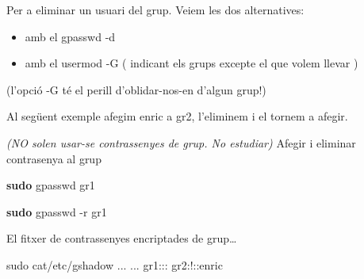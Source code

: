 \documentclass[
  a4paper,
]{article}
\newenvironment{Shaded}{\begin{snugshade}}{\end{snugshade}}
\newcommand{\AttributeTok}[1]{\textcolor[rgb]{0.13,0.29,0.53}{#1}}
\newcommand{\ExtensionTok}[1]{#1}
\newcommand{\FunctionTok}[1]{\textcolor[rgb]{0.13,0.29,0.53}{\textbf{#1}}}
\newcommand{\NormalTok}[1]{#1}
\newcommand{\StringTok}[1]{\textcolor[rgb]{0.31,0.60,0.02}{#1}}
\begin{document}
Per a eliminar un usuari del grup. Veiem les dos alternatives:

\begin{itemize}
\item
  amb el gpasswd -d
\item
  amb el usermod -G ( indicant els grups excepte el que volem llevar )
\end{itemize}

(l'opció -G té el perill d'oblidar-nos-en d'algun grup!)

Al següent exemple afegim enric a gr2, l'eliminem i el tornem a afegir.

\begin{Shaded}
\end{Shaded}

\emph{(NO solen usar-se contrassenyes de grup. No estudiar)} Afegir i
eliminar contrasenya al grup

\begin{Shaded}
\begin{Highlighting}[]
\FunctionTok{sudo}\NormalTok{ gpasswd gr1}
\end{Highlighting}
\end{Shaded}

\begin{Shaded}
\begin{Highlighting}[]
\FunctionTok{sudo}\NormalTok{ gpasswd }\AttributeTok{{-}r}\NormalTok{ gr1}
\end{Highlighting}
\end{Shaded}

El fitxer de contrassenyes encriptades de grup\ldots{}

\begin{Shaded}
\begin{Highlighting}[]
\NormalTok{sudo cat/etc/gshadow}
\NormalTok{...}
\NormalTok{...}
\NormalTok{gr1:::}
\NormalTok{gr2:!::enric}
\end{Highlighting}
\end{Shaded}
\end{document}
